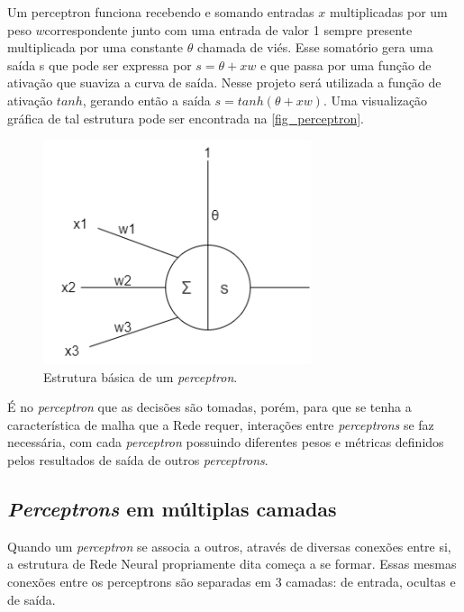Um perceptron funciona recebendo e somando entradas \(x\) multiplicadas por 
um peso \(w\)correspondente junto com uma entrada de valor 1 sempre presente 
multiplicada por uma constante \(\theta\) chamada de viés. Esse somatório gera uma saída 
s que pode ser expressa por \(s = \theta + xw\) e que passa por uma função de ativação 
que suaviza a curva de saída. Nesse projeto será utilizada a função de ativação 
\(tanh\), gerando então a saída \(s = tanh( \theta + xw)\). Uma visualização gráfica de tal 
estrutura pode ser encontrada na \autoref{fig_perceptron}.

\begin{figure}[htb]
        \centering
        \caption{\label{fig_perceptron}Estrutura b{\'a}sica de um \textit{perceptron}.}
        \includegraphics[width=0.7\textwidth]{images/Perceptron.png}
\end{figure}

{\'E} no \textit{perceptron} que as decisões são tomadas, porém, para que se tenha a 
característica de malha que a Rede requer, interações entre \textit{perceptrons} se faz 
necessária, com cada \textit{perceptron} possuindo diferentes pesos e métricas definidos 
pelos resultados de saída de outros \textit{perceptrons}.

\subsection{\textit{Perceptrons} em m{\'u}ltiplas camadas}

Quando um \textit{perceptron} se associa a outros, através de diversas conexões 
entre si, a estrutura de Rede Neural propriamente dita começa a se formar. Essas 
mesmas conexões entre os perceptrons são separadas em 3 camadas: de entrada, 
ocultas e de saída.

